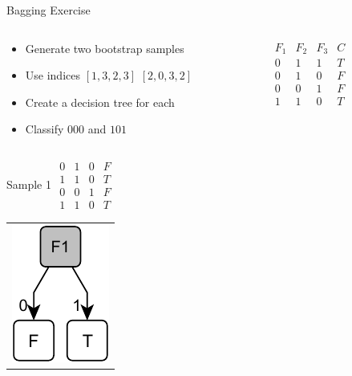 \documentclass[14pt]{beamer}
\begin{document}
\begin{frame}{Bagging Exercise}
\begin{columns}
\begin{column}{2.8in}
\begin{itemize}
\item Generate two bootstrap samples
\item Use indices $[1, 3, 2, 3]$ $[2, 0, 3, 2]$
\item Create a decision tree for each
\item Classify $000$ and $101$
\end{itemize}
\end{column}
\begin{column}{1.2in}
$
\begin{array}{lll|l}
F_1 & F_2 & F_3 & C \\
\hline
0   & 1   & 1   & T \\
0   & 1   & 0   & F \\
0   & 0   & 1   & F \\
1   & 1   & 0   & T
\end{array}
$
\end{column}
\end{columns}
\pause
\begin{columns}
\begin{column}{2in}
\begin{block}{Sample 1}
$
\begin{array}{lll|l}
0   & 1   & 0   & F \\
1   & 1   & 0   & T \\
0   & 0   & 1   & F \\
1   & 1   & 0   & T
\end{array}
$
\begin{tabular}{l}
\includegraphics[height=.8in]{bagging-1}
\end{tabular}
\end{block}
\end{column}
\begin{column}{2in}
\end{column}
\end{columns}
\end{frame}
\end{document}
